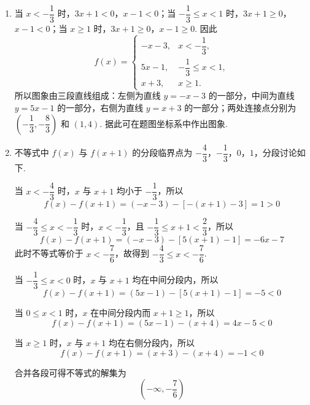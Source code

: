 \begin{solution}
\begin{enumerate}
\item 当 \(x<-\dfrac13\) 时，\(3x+1<0\)，\(x-1<0\)；当 \(-\dfrac13\le x<1\) 时，\(3x+1\ge0\)，\(x-1<0\)；当 \(x\ge1\) 时，\(3x+1\ge0\)，\(x-1\ge0\). 因此
\[
f(x)=
\begin{cases}
-x-3,&x<-\dfrac13,\\
5x-1,&-\dfrac13\le x<1,\\
x+3,&x\ge1.
\end{cases}
\]
所以图象由三段直线组成：左侧为直线 \(y=-x-3\) 的一部分，中间为直线 \(y=5x-1\) 的一部分，右侧为直线 \(y=x+3\) 的一部分；两处连接点分别为 \(\left(-\dfrac13,-\dfrac83\right)\) 和 \((1,4)\). 据此可在题图坐标系中作出图象.

\item 不等式中 \(f(x)\) 与 \(f(x+1)\) 的分段临界点为 \(-\dfrac43\)，\(-\dfrac13\)，\(0\)，\(1\)，分段讨论如下.

当 \(x<-\dfrac43\) 时，\(x\) 与 \(x+1\) 均小于 \(-\dfrac13\)，所以
\[
f(x)-f(x+1)=(-x-3)-[-(x+1)-3]=1>0
\]

当 \(-\dfrac43\le x<-\dfrac13\) 时，\(x<-\dfrac13\)，且 \(-\dfrac13\le x+1<\dfrac23\)，所以
\[
f(x)-f(x+1)=(-x-3)-[5(x+1)-1]=-6x-7
\]
此时不等式等价于 \(x<-\dfrac76\)，故得到 \(-\dfrac43\le x<-\dfrac76\).

当 \(-\dfrac13\le x<0\) 时，\(x\) 与 \(x+1\) 均在中间分段内，所以
\[
f(x)-f(x+1)=(5x-1)-[5(x+1)-1]=-5<0
\]

当 \(0\le x<1\) 时，\(x\) 在中间分段内而 \(x+1\ge1\)，所以
\[
f(x)-f(x+1)=(5x-1)-(x+4)=4x-5<0
\]

当 \(x\ge1\) 时，\(x\) 与 \(x+1\) 均在右侧分段内，所以
\[
f(x)-f(x+1)=(x+3)-(x+4)=-1<0
\]

合并各段可得不等式的解集为
\[
\left(-\infty,-\dfrac76\right)
\]
\end{enumerate}
\end{solution}
